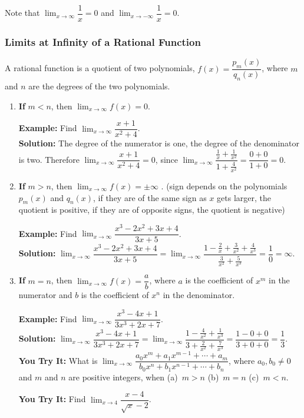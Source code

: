 \documentclass[titlepage,a4paper,12pt]{report}
\begin{document}
\noindent Note that $\displaystyle \lim _{x\rightarrow \infty} \dfrac{1}{x}=0$ and $\displaystyle \lim _{x\rightarrow -\infty} \dfrac{1}{x}=0$.

\subsubsection{Limits at Infinity of a Rational Function}
A rational function is a quotient of two polynomials, $f(x)=\dfrac{p_m(x)}{q_n (x)}$, where $m$ and $n$ are the degrees of the two polynomials.
\begin{enumerate}
\item \textbf{If} $m<n$, then $\displaystyle \lim _{x\rightarrow \infty}f(x)=0$.

\noindent \textbf{Example:} Find $\displaystyle \lim _{x\rightarrow \infty}\dfrac{x+1}{x^2+4} $.\\

\textbf{Solution:} The degree of the numerator is one, the degree of the denominator is two. Therefore $\displaystyle \lim _{x\rightarrow \infty}\dfrac{x+1}{x^2+4} =0$, since  $\displaystyle \lim _{x\rightarrow \infty}\dfrac{\frac{1}{x}+\frac{1}{x^2}}{1+\frac{4}{x^2}}=\dfrac{0+0}{1+0} =0$.
\item \textbf{If} $m>n$, then $\displaystyle \lim _{x\rightarrow \infty}f(x)=\pm \infty$ . (sign depends on the polynomials $p_m(x)$ and $q_n(x)$, if they are of the same sign as $x$ gets larger, the quotient is positive, if they are of opposite signs, the quotient is negative)

\textbf{Example:} Find $\displaystyle \lim _{x\rightarrow \infty}\dfrac{x^3-2x^2+3x+4}{3x+5}$.\\

\textbf{Solution:} $\displaystyle \lim _{x\rightarrow \infty}\dfrac{x^3-2x^2+3x+4}{3x+5}=\lim _{x\rightarrow \infty}\dfrac{1-\frac{2}{x}+\frac{3}{x^2}+\frac{4}{x^3}}{\frac{3}{x^2}+\frac{5}{x^3}}=\dfrac{1}{0}=\infty$.
\item \textbf{If} $m=n$, then $\displaystyle \lim _{x\rightarrow \infty}f(x)=\dfrac{a}{b}$, where $a$ is the coefficient of $x^m$ in the numerator and $b$ is the coefficient of $x^n$ in the denominator.


\textbf{Example:} Find $\displaystyle \lim _{x\rightarrow \infty}\dfrac{x^3-4x+1}{3x^3+2x+7}$.\\

\textbf{Solution:} $\displaystyle \lim _{x\rightarrow \infty}\dfrac{x^3-4x+1}{3x^3+2x+7}=\lim _{x\rightarrow \infty} \dfrac{1-\frac{4}{x^2}+\frac{1}{x^3}}{3+\frac{2}{x^2}+\frac{7}{x^3}}=\dfrac{1-0+0}{3+0+0}=\dfrac{1}{3}$.\\


\textbf{You Try It:} What is $\displaystyle \lim _{x\rightarrow \infty}\dfrac{a_0x^m+a_1x^{m-1}+\cdots + a_m}{b_0x^n+b_1x^{n-1}+\cdots +b_n}$, where $a_0, b_0 \neq 0$ and $m$ and $n$ are positive integers, when (a)\, $m>n$ \quad (b)\, $m=n$ \quad (c)\, $m<n$.

\textbf{You Try It:} Find $\displaystyle \lim _{x\rightarrow 4} \dfrac{x-4}{\sqrt{x}-2}$.
\end{enumerate}
\end{document}
